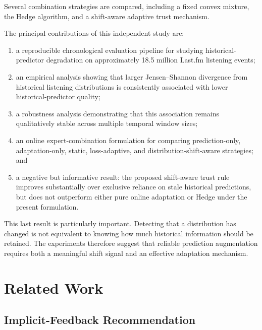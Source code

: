 \documentclass[11pt]{article}
\begin{document}
Several combination strategies are compared, including a fixed convex
mixture, the Hedge algorithm, and a shift-aware adaptive trust
mechanism.

The principal contributions of this independent study are:

\begin{enumerate}
    \item a reproducible chronological evaluation pipeline for
    studying historical-predictor degradation on approximately
    18.5 million Last.fm listening events;

    \item an empirical analysis showing that larger Jensen--Shannon
    divergence from historical listening distributions is consistently
    associated with lower historical-predictor quality;

    \item a robustness analysis demonstrating that this association
    remains qualitatively stable across multiple temporal window sizes;

    \item an online expert-combination formulation for comparing
    prediction-only, adaptation-only, static, loss-adaptive, and
    distribution-shift-aware strategies; and

    \item a negative but informative result: the proposed shift-aware
    trust rule improves substantially over exclusive reliance on stale
    historical predictions, but does not outperform either pure online
    adaptation or Hedge under the present formulation.
\end{enumerate}

This last result is particularly important. Detecting that a
distribution has changed is not equivalent to knowing how much
historical information should be retained. The experiments therefore
suggest that reliable prediction augmentation requires both a
meaningful shift signal and an effective adaptation mechanism.


\section{Related Work}

\subsection{Implicit-Feedback Recommendation}
\end{document}
